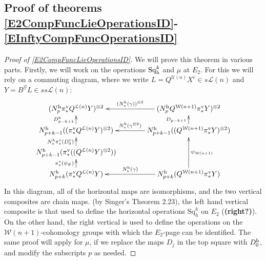 \documentclass[11pt]{amsart}
\theoremstyle{plain}
\theoremstyle{definition}
\newcommand{\scrG}{\mathscr{G}}
\newcommand{\calU}{\mathcal{U}}
\newcommand{\calL}{\mathcal{L}}
\newcommand{\calw}{\mathcal{W}}
\theoremstyle{plain}
\newcommand{\BSW}{{\scrG}}
\newcommand{\BSWres}{B^\BSW}%
\newcommand{\Sq}{\mathrm{Sq}}
\newcommand{\Sqh}{\mathrm{Sq}_\textup{h}}
\begin{document}
\begin{Operations in composite functor spectral sequences}
\subsection{Proof of theorems \ref{E2CompFuncLieOperationsID}-\ref{EInftyCompFuncOperationsID}}

\begin{proof}[Proof of \ref{E2CompFuncLieOperationsID}]
We will prove this theorem in various parts. Firstly, we will work on the operations $\Sqh^k$ and $\mu$ at $E_2$.
For this we will rely on a commuting diagram, where we write $L=Q^{\calU(n)}X^c\in s\calL(n)$ and $Y=\BSWres L\in ss\calL(n)$:
\[\xymatrix@C=13mm@R=4mm{
(N_p^\textup{h}\pi_*^{\textup{v}}Q^{\calL(n)}Y)^{\otimes2}&%
(N_p^\textup{h}Q^{\calw(n+1)}\pi_*^{\textup{v}}Y)^{\otimes2}
\ar[l]_-{(N^\textup{h}_*(\gamma))^{\otimes 2}}
\\%
N_{p+k-1}^\textup{h}((\pi_*^{\textup{v}}Q^{\calL(n)}Y)^{\otimes2})
\ar[u]^-{D_{p-k+1}^\textup{h}}
&%
N_{p+k-1}^\textup{h}((Q^{\calw(n+1)}\pi_*^{\textup{v}}Y)^{\otimes2})
\ar[u]^-{D_{p-k+1}}
\ar[l]_-{N^\textup{h}_*(\gamma^{\otimes 2})}
\\%
N_{p+k-1}^\textup{h}(\pi_*^{\textup{v}}((Q^{\calL(n)}Y)^{\otimes2}))
\ar[u]^-{N^\textup{h}_*\pi_*^\textup{v}(D_0^\textup{v})}
&%
\\%
N^\textup{h}_{p+k}(\pi_*^{\textup{v}} Q^{\calL(n)}Y)
\ar[u]^-{\pi_*^\textup{v}(\psi_{\BSW})}
&%
N^\textup{h}_{p+k}(Q^{\calw(n+1)}\pi_*^{\textup{v}} Y)
\ar[uu]_-{\psi_{\calw(n+1)}}
\ar[l]_-{N^\textup{h}_*(\gamma)}
}\]
In this diagram, all of the horizontal maps are isomorphisms, and the two vertical composites are chain maps. (by Singer's Theorem 2.23),  the left hand vertical composite is that used to define the horizontal operations $\Sq^{k}_h$ on $E_2$ (\textbf{(right?)}). On the other hand, the right vertical is used to define the operations on the $\calw(n+1)$-cohomology groups with which the $E_2$-page can be identified. The same proof will apply for $\mu$, if we replace the maps $D_j$ in the top square with $D_0^\textup{h}$, and modify the subscripts $p$ as needed.


\end{proof}
\end{Operations in composite functor spectral sequences}
\end{document}
